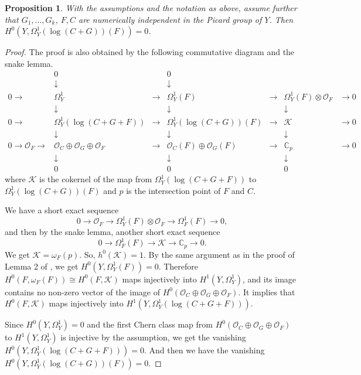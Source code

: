 \documentclass[twoside,11pt]{amsart}
\newtheorem{proposition}{Proposition}[section]
\begin{document}
\begin{proposition}
\label{pro-4.1} With the assumptions and the notation as above,
assume further that $G_1, \ldots, G_k$, $F, C$
are numerically independent in the Picard group of $Y$. Then $H^0(Y, \Omega_Y^1({\operatorname{log}}(C+G))(F))=0$.
\end{proposition}

\begin{proof}
The proof is also obtained by the following commutative diagram and
the snake lemma.
\[\begin{array}{ccccccc}
& 0 & & 0& &  & \\
& \downarrow & & \downarrow & &  & \\
0\to & \Omega_Y^1 & \to & \Omega_Y^1(F) & \to & \Omega_Y^1(F)\otimes{{\mathcal O}}_F &\to 0 \\
& \downarrow & & \downarrow & & \downarrow & \\
0\to & \Omega_Y^1({\operatorname{log}}(C+G+F)) & \to & \Omega_Y^1({\operatorname{log}}(C+G))(F) & \to & {{\mathcal K}} &\to 0 \\
& \downarrow & & \downarrow & & \downarrow & \\
0\to{{\mathcal O}}_F\to & {{\mathcal O}}_C\oplus{{\mathcal O}}_G\oplus{{\mathcal O}}_F & \to &
{{\mathcal O}}_C(F)\oplus{{\mathcal O}}_G(F) & \to & {{\mathbb C}}_p &\to
0\\
& \downarrow & & \downarrow & & \downarrow & \\
& 0 & & 0& & 0 &
\end{array}\]
where ${{\mathcal K}}$ is the cokernel of the map from
$\Omega_Y^1({\operatorname{log}}(C+G+F))$ to $\Omega_Y^1({\operatorname{log}}(C+G))(F)$ and $p$ is
the intersection point of $F$ and $C$.

We have a short exact sequence
\[0\to {{\mathcal O}}_F\to \Omega_Y^1(F)\otimes{{\mathcal O}}_F \to \Omega_F^1(F)\to 0,\]
and then by the snake lemma, another short exact sequence
\[0\to \Omega_F^1(F)\to {{\mathcal K}}\to {{\mathbb C}}_p\to 0.\]
We get ${{\mathcal K}}=\omega_F(p)$. So, $h^0({{\mathcal K}})=1$. By the same argument
as in the proof of Lemma 2 of \cite{LP1}, we get $H^0(Y,
\Omega_Y^1(F))=0$. Therefore $H^0(F, \omega_F(F))\cong H^0(F,{{\mathcal K}})$
maps injectively into $H^1(Y, \Omega_Y^1)$, and its image contains
no non-zero vector of the image of
$H^0({{\mathcal O}}_C\oplus{{\mathcal O}}_G\oplus{{\mathcal O}}_F)$. It implies that $H^0(F, {{\mathcal K}})$
maps injectively into $H^1(Y, \Omega^1_Y({\operatorname{log}}(C+G+F)))$.

Since $H^0(Y, \Omega_Y^1)=0$ and the first Chern class map from
$H^0({{\mathcal O}}_C\oplus{{\mathcal O}}_G\oplus{{\mathcal O}}_F)$ to $H^1(Y, \Omega_Y^1)$ is
injective by the assumption, we get the vanishing $H^0(Y,
\Omega_Y^1({\operatorname{log}}(C+G+F)))=0$. And then we have the vanishing $H^0(Y,
\Omega_Y^1({\operatorname{log}}(C+G))(F))=0$.
\end{proof}
\end{document}
